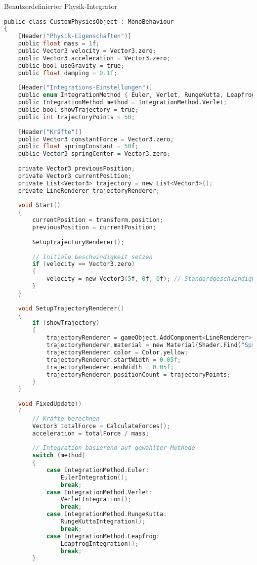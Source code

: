 \begin{code}{Benutzerdefinierter Physik-Integrator}\\
\begin{lstlisting}[language=C, style=basesmol]
public class CustomPhysicsObject : MonoBehaviour 
{
    [Header("Physik-Eigenschaften")]
    public float mass = 1f;
    public Vector3 velocity = Vector3.zero;
    public Vector3 acceleration = Vector3.zero;
    public bool useGravity = true;
    public float damping = 0.1f;
    
    [Header("Integrations-Einstellungen")]
    public enum IntegrationMethod { Euler, Verlet, RungeKutta, Leapfrog }
    public IntegrationMethod method = IntegrationMethod.Verlet;
    public bool showTrajectory = true;
    public int trajectoryPoints = 50;
    
    [Header("Kräfte")]
    public Vector3 constantForce = Vector3.zero;
    public float springConstant = 50f;
    public Vector3 springCenter = Vector3.zero;
    
    private Vector3 previousPosition;
    private Vector3 currentPosition;
    private List<Vector3> trajectory = new List<Vector3>();
    private LineRenderer trajectoryRenderer;
    
    void Start() 
    {
        currentPosition = transform.position;
        previousPosition = currentPosition;
        
        SetupTrajectoryRenderer();
        
        // Initiale Geschwindigkeit setzen
        if (velocity == Vector3.zero) 
        {
            velocity = new Vector3(5f, 0f, 0f); // Standardgeschwindigkeit
        }
    }
    
    void SetupTrajectoryRenderer() 
    {
        if (showTrajectory) 
        {
            trajectoryRenderer = gameObject.AddComponent<LineRenderer>();
            trajectoryRenderer.material = new Material(Shader.Find("Sprites/Default"));
            trajectoryRenderer.color = Color.yellow;
            trajectoryRenderer.startWidth = 0.05f;
            trajectoryRenderer.endWidth = 0.05f;
            trajectoryRenderer.positionCount = trajectoryPoints;
        }
    }
    
    void FixedUpdate() 
    {
        // Kräfte berechnen
        Vector3 totalForce = CalculateForces();
        acceleration = totalForce / mass;
        
        // Integration basierend auf gewählter Methode
        switch (method) 
        {
            case IntegrationMethod.Euler:
                EulerIntegration();
                break;
            case IntegrationMethod.Verlet:
                VerletIntegration();
                break;
            case IntegrationMethod.RungeKutta:
                RungeKuttaIntegration();
                break;
            case IntegrationMethod.Leapfrog:
                LeapfrogIntegration();
                break;
        }
        

\end{lstlisting}
\end{code}
